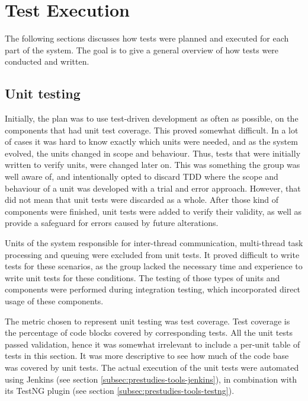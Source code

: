 \section{Test Execution}
\label{subsec:testing-test_execution}

The following sections discusses how tests were planned and executed for each part of the system. The goal is to give a general overview of how tests were conducted and written.

\subsection{Unit testing}
\label{subsec:testing-test_execution-unit_testing}

Initially, the plan was to use test-driven development as often as possible, on the components that had unit test coverage. This proved somewhat difficult. In a lot of cases it was hard to know exactly which units were needed, and as the system evolved, the units changed in scope and behaviour. Thus, tests that were initially written to verify units, were changed later on. This was something the group was well aware of, and intentionally opted to discard TDD where the scope and behaviour of a unit was developed with a trial and error approach. However, that did not mean that unit tests were discarded as a whole. After those kind of components were finished, unit tests were added to verify their validity, as well as provide a safeguard for errors caused by future alterations.

Units of the system responsible for inter-thread communication, multi-thread task processing and queuing were excluded from unit tests. It proved difficult to write tests for these scenarios, as the group lacked the necessary time and experience to write unit tests for these conditions. The testing of those types of units and components were performed during integration testing, which incorporated direct usage of these components.

The metric chosen to represent unit testing was test coverage. Test coverage is the percentage of code blocks covered by corresponding tests. All the unit tests passed validation, hence it was somewhat irrelevant to include a per-unit table of tests in this section. It was more descriptive to see how much of the code base was covered by unit tests. The actual execution of the unit tests were automated using Jenkins (see section \ref{subsec:prestudies-tools-jenkins}), in combination with its TestNG plugin (see section \ref{subsec:prestudies-tools-testng}).

